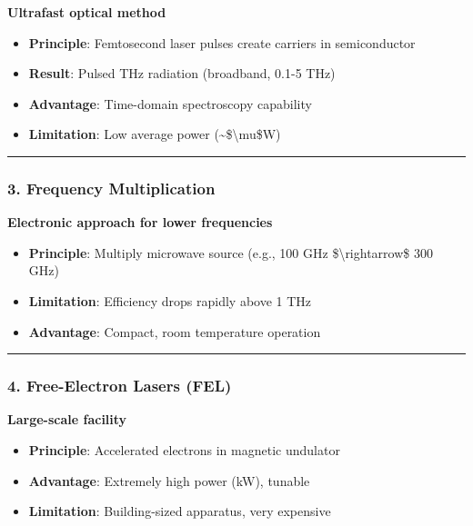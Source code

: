 \textbf{Ultrafast optical method}

\begin{itemize}
\tightlist
\item
  \textbf{Principle}: Femtosecond laser pulses create carriers in
  semiconductor
\item
  \textbf{Result}: Pulsed THz radiation (broadband, 0.1-5 THz)
\item
  \textbf{Advantage}: Time-domain spectroscopy capability
\item
  \textbf{Limitation}: Low average power
  (\textasciitilde\$\textbackslash mu\$W)
\end{itemize}

\begin{center}\rule{0.5\linewidth}{0.5pt}\end{center}

\subsubsection{3. Frequency
Multiplication}\label{frequency-multiplication}

\textbf{Electronic approach for lower frequencies}

\begin{itemize}
\tightlist
\item
  \textbf{Principle}: Multiply microwave source (e.g., 100 GHz
  \$\textbackslash rightarrow\$ 300 GHz)
\item
  \textbf{Limitation}: Efficiency drops rapidly above 1 THz
\item
  \textbf{Advantage}: Compact, room temperature operation
\end{itemize}

\begin{center}\rule{0.5\linewidth}{0.5pt}\end{center}

\subsubsection{4. Free-Electron Lasers
(FEL)}\label{free-electron-lasers-fel}

\textbf{Large-scale facility}

\begin{itemize}
\tightlist
\item
  \textbf{Principle}: Accelerated electrons in magnetic undulator
\item
  \textbf{Advantage}: Extremely high power (kW), tunable
\item
  \textbf{Limitation}: Building-sized apparatus, very expensive
\end{itemize}


